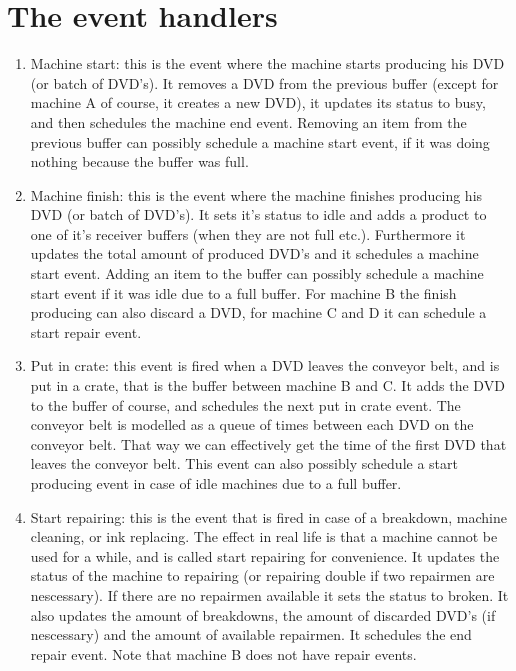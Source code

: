 \documentclass{report}
\begin{document}
\section{The event handlers}
\begin{enumerate}
    \item Machine start:
        this is the event where the machine starts producing his DVD (or batch of DVD's).
        It removes a DVD from the previous buffer
        (except for machine A of course, it creates a new DVD),
        it updates its status to busy, and then schedules the machine end event.
        Removing an item from the previous buffer can possibly schedule a machine start event, if it was doing nothing because the buffer was full.
    \item Machine finish:
        this is the event where the machine finishes producing his DVD (or batch of DVD's).
        It sets it's status to idle and adds a product to one of it's receiver buffers (when they are not full etc.).
        Furthermore it updates the total amount of produced DVD's and it schedules a machine start event.
        Adding an item to the buffer can possibly schedule a machine start event if it was idle due to a full buffer.
        For machine B the finish producing can also discard a DVD,
        for machine C and D it can schedule a start repair event.

    \item Put in crate:
        this event is fired when a DVD leaves the conveyor belt, and is put in a crate, that is the buffer between machine B and C.
        It adds the DVD to the buffer of course, and schedules the next put in crate event.
        The conveyor belt is modelled as a queue of times between each DVD on the conveyor belt. That way we can effectively get the time of the first DVD that leaves the conveyor belt.
        This event can also possibly schedule a start producing event in case of idle machines due to a full buffer.

    \item Start repairing:
        this is the event that is fired in case of a breakdown, machine cleaning, or ink replacing. The effect in real life is that a machine cannot be used for a while, and is called start repairing for convenience.
        It updates the status of the machine to repairing
        (or repairing double if two repairmen are nescessary).
        If there are no repairmen available it sets the status to broken.
        It also updates the amount of breakdowns, the amount of discarded DVD's (if nescessary) and the amount of available repairmen.
        It schedules the end repair event.
        Note that machine B does not have repair events.


\end{enumerate}
\end{document}
